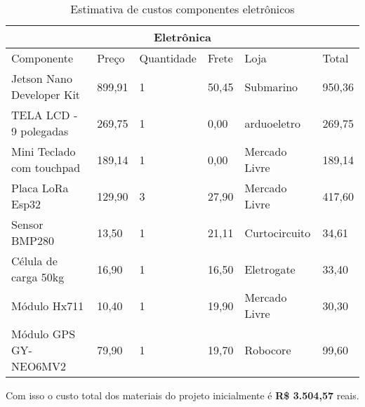 \begin{table}[H]
\begin{tabular}{| m{6cm}|m{1cm}|m{2cm}|m{1cm}|m{3cm}|m{1cm}|}
\hline
\multicolumn{6}{|c|}{\textbf{Eletrônica}}                                                 \\ \hline
Componente                & Preço  & Quantidade & Frete & Loja          & Total  \\ \hline
Jetson Nano Developer Kit  & 899,91 & 1          & 50,45 & Submarino    & 950,36 \\ \hline
TELA LCD - 9 polegadas    & 269,75 & 1          & 0,00  & arduoeletro   & 269,75 \\ \hline
Mini Teclado com touchpad & 189,14 & 1          & 0,00  & Mercado Livre & 189,14 \\ \hline
Placa LoRa Esp32          & 129,90 & 3          & 27,90 & Mercado Livre & 417,60 \\ \hline
Sensor BMP280             & 13,50  & 1          & 21,11 & Curtocircuito & 34,61  \\ \hline
Célula de carga 50kg      & 16,90  & 1          & 16,50 & Eletrogate    & 33,40  \\ \hline
Módulo Hx711              & 10,40  & 1          & 19,90 & Mercado Livre & 30,30  \\ \hline
Módulo GPS GY-NEO6MV2     & 79,90  & 1          & 19,70 & Robocore      & 99,60  \\ \hline
\end{tabular}
\caption{Estimativa de custos componentes eletrônicos}
\end{table}



Com isso o custo total dos materiais do projeto inicialmente é\textbf{ R\$ 3.504,57} reais.